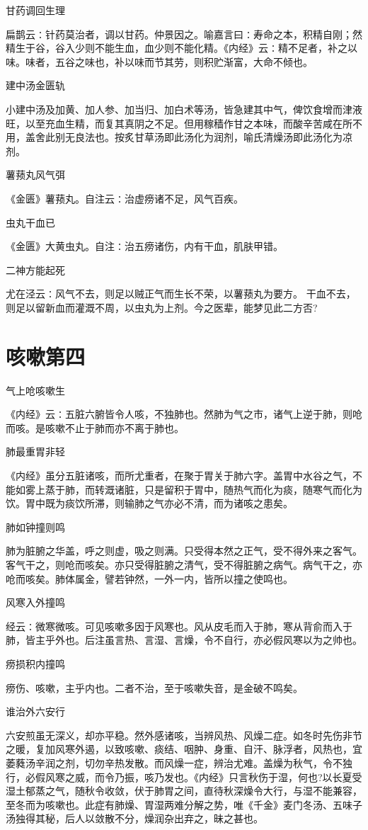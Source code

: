 \documentclass[a4paper,12pt,UTF8,twoside]{ctexbook}
\begin{document}
	甘药调回生理
	
	扁鹊云∶针药莫治者，调以甘药。仲景因之。喻嘉言曰∶寿命之本，积精自刚；然精生于谷，谷入少则不能生血，血少则不能化精。《内经》云∶精不足者，补之以味。味者，五谷之味也，补以味而节其劳，则积贮渐富，大命不倾也。
	
	建中汤金匮轨
	
	小建中汤及加黄、加人参、加当归、加白术等汤，皆急建其中气，俾饮食增而津液旺，以至充血生精，而复其真阴之不足。但用稼穑作甘之本味，而酸辛苦咸在所不用，盖舍此别无良法也。按炙甘草汤即此汤化为润剂，喻氏清燥汤即此汤化为凉剂。
	
	薯蓣丸风气弭
	
	《金匮》薯蓣丸。自注云∶治虚痨诸不足，风气百疾。
	
	虫丸干血已
	
	《金匮》大黄虫丸。自注∶治五痨诸伤，内有干血，肌肤甲错。
	
	二神方能起死
	
	尤在泾云∶风气不去，则足以贼正气而生长不荣，以薯蓣丸为要方。
	干血不去，则足以留新血而灌溉不周，以虫丸为上剂。今之医辈，能梦见此二方否?
	
	\chapter{咳嗽第四}
	气上呛咳嗽生

	《内经》云∶五脏六腑皆令人咳，不独肺也。然肺为气之市，诸气上逆于肺，则呛而咳。是咳嗽不止于肺而亦不离于肺也。
	
	肺最重胃非轻

	《内经》虽分五脏诸咳，而所尤重者，在聚于胃关于肺六字。盖胃中水谷之气，不能如雾上蒸于肺，而转溉诸脏，只是留积于胃中，随热气而化为痰，随寒气而化为饮。胃中既为痰饮所滞，则输肺之气亦必不清，而为诸咳之患矣。
	
	肺如钟撞则鸣

	肺为脏腑之华盖，呼之则虚，吸之则满。只受得本然之正气，受不得外来之客气。客气干之，则呛而咳矣。亦只受得脏腑之清气，受不得脏腑之病气。病气干之，亦呛而咳矣。肺体属金，譬若钟然，一外一内，皆所以撞之使鸣也。
	
	风寒入外撞鸣

	经云∶微寒微咳。可见咳嗽多因于风寒也。风从皮毛而入于肺，寒从背俞而入于肺，皆主乎外也。后注虽言热、言湿、言燥，令不自行，亦必假风寒以为之帅也。
	
	痨损积内撞鸣

	痨伤、咳嗽，主乎内也。二者不治，至于咳嗽失音，是金破不鸣矣。
	
	谁治外六安行

	六安煎虽无深义，却亦平稳。然外感诸咳，当辨风热、风燥二症。如冬时先伤非节之暖，复加风寒外遏，以致咳嗽、痰结、咽肿、身重、自汗、脉浮者，风热也，宜萎蕤汤辛润之剂，切勿辛热发散。而风燥一症，辨治尤难。盖燥为秋气，令不独行，必假风寒之威，而令乃振，咳乃发也。《内经》只言秋伤于湿，何也?以长夏受湿土郁蒸之气，随秋令收敛，伏于肺胃之间，直待秋深燥令大行，与湿不能兼容，至冬而为咳嗽也。此症有肺燥、胃湿两难分解之势，唯《千金》麦门冬汤、五味子汤独得其秘，后人以敛散不分，燥润杂出弃之，昧之甚也。
	
\end{document}
